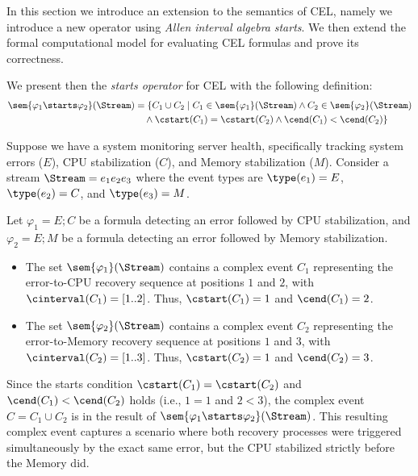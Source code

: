 In this section we introduce an extension to the semantics of CEL, namely we introduce a new operator using \textit{Allen interval algebra} \textit{starts}. 
We then extend the formal computational model for evaluating CEL formulas and prove its correctness. 

We present then the \emph{starts operator} for CEL with the following definition:
\[ 
\begin{aligned}
	\sem{\varphi_1 \starts \varphi_2}(\Stream)
	&= \{C_1 \cup C_2 \mid C_1 \in \sem{\varphi_1}(\Stream) 
	\land C_2 \in \sem{\varphi_2}(\Stream) \\
	&\quad \land \cstart(C_1) = \cstart(C_2) \land \cend(C_1) < \cend(C_2)\}
\end{aligned}
\]

\begin{example} Suppose we have a system monitoring server health, specifically tracking system errors ($E$), CPU stabilization ($C$), and Memory stabilization ($M$). Consider a stream $\Stream = e_1 e_2 e_3$ where the event types are $\type(e_1) = E$, $\type(e_2) = C$, and $\type(e_3) = M$. 
	
	Let $\varphi_1 = E ; C$ be a formula detecting an error followed by CPU stabilization, and $\varphi_2 = E ; M$ be a formula detecting an error followed by Memory stabilization.
	\begin{itemize}
		\item The set $\sem{\varphi_1}(\Stream)$ contains a complex event $C_1$ representing the error-to-CPU recovery sequence at positions $1$ and $2$, with $\cinterval(C_1) = [1..2]$. Thus, $\cstart(C_1) = 1$ and $\cend(C_1) = 2$.
		\item The set $\sem{\varphi_2}(\Stream)$ contains a complex event $C_2$ representing the error-to-Memory recovery sequence at positions $1$ and $3$, with $\cinterval(C_2) = [1..3]$. Thus, $\cstart(C_2) = 1$ and $\cend(C_2) = 3$.
	\end{itemize}
	
	Since the starts condition $\cstart(C_1) = \cstart(C_2)$ and $\cend(C_1) < \cend(C_2)$ holds (i.e., $1 = 1$ and $2 < 3$), the complex event $C = C_1 \cup C_2$ is in the result of $\sem{\varphi_1 \starts \varphi_2}(\Stream)$. This resulting complex event captures a scenario where both recovery processes were triggered simultaneously by the exact same error, but the CPU stabilized strictly before the Memory did.
	
\end{example}

